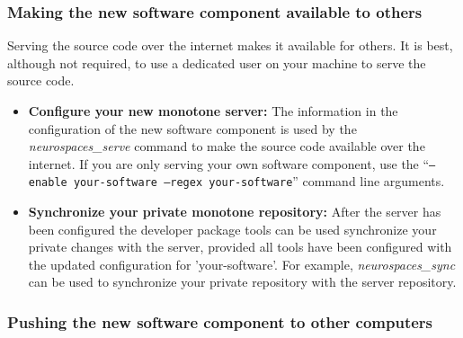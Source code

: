 \documentclass[12pt]{article}
\begin{document}
\subsubsection*{Making the new software component available to others}

Serving the source code over the internet makes it available for
others.  It is best, although not required, to use a dedicated user on
your machine to serve the source code.

\begin{itemize}
\item {\bf Configure your new monotone server:} The information in the
  configuration of the new software component is used by the {\it
    neurospaces\_serve} command to make the source code available over
  the internet.  If you are only serving your own software component,
  use the ``{\tt --enable your-software --regex your-software}''
  command line arguments.
  
\item {\bf Synchronize your private monotone repository:} After the
  server has been configured the developer package tools can be used
  synchronize your private changes with the server, provided all tools
  have been configured with the updated configuration for
  'your-software'.  For example, {\it neurospaces\_sync} can be used
  to synchronize your private repository with the server repository.
\end{itemize}
  
\subsubsection*{Pushing the new software component to other computers}
\end{document}
